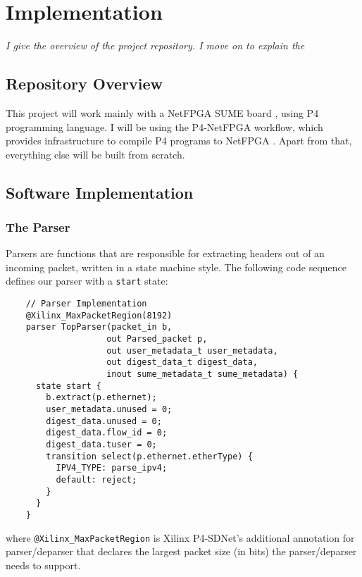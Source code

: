 \chapter{Implementation}
\textit{I give the overview of the project repository. I move on to explain the  }

\section{Repository Overview}



This project will work mainly with a NetFPGA SUME board \cite{zilberman2014netfpga}, using P4 programming language. I will be using the P4-NetFPGA workflow, which provides infrastructure to compile P4 programs to NetFPGA \cite{fpga}. Apart from that, everything else will be built from scratch.

\section{Software Implementation}
	\subsection{The Parser}
Parsers are functions that are responsible for extracting headers out of an incoming packet, written in a state machine style. The following code sequence defines our parser with a \texttt{start} state:

{\renewcommand{\baselinestretch}{0.8}\small
	\begin{verbatim}
    // Parser Implementation
    @Xilinx_MaxPacketRegion(8192)
    parser TopParser(packet_in b, 
                    out Parsed_packet p, 
                    out user_metadata_t user_metadata,
                    out digest_data_t digest_data,
                    inout sume_metadata_t sume_metadata) {
      state start {
        b.extract(p.ethernet);
        user_metadata.unused = 0;
        digest_data.unused = 0;
        digest_data.flow_id = 0;
        digest_data.tuser = 0;
        transition select(p.ethernet.etherType) {
          IPV4_TYPE: parse_ipv4;
          default: reject;
        } 
      }   
    }
	\end{verbatim}
}
where \texttt{@Xilinx\_MaxPacketRegion} is Xilinx P4-SDNet's additional annotation for parser/deparser that declares the largest packet size (in bits) the parser/deparser needs to support.

